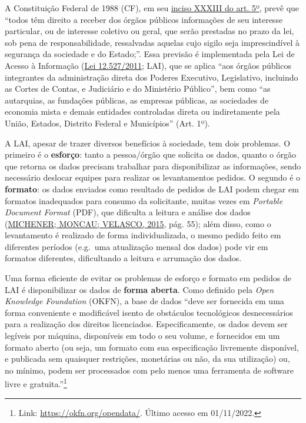\documentclass[12pt,twoside,brazilian]{book}
\begin{document}
A Constituição Federal de 1988 (CF), em seu
\href{https://constituicao.stf.jus.br/dispositivo/cf-88-parte-1-titulo-2-capitulo-1-artigo-5-inciso-33}{inciso
XXXIII do art. 5º}, prevê que ``todos têm direito a receber dos órgãos
públicos informações de seu interesse particular, ou de interesse
coletivo ou geral, que serão prestadas no prazo da lei, sob pena de
responsabilidade, ressalvadas aquelas cujo sigilo seja imprescindível à
segurança da sociedade e do Estado;''. Essa previsão é implementada pela
Lei de Acesso à Informação
(\href{https://www.planalto.gov.br/ccivil_03/_ato2011-2014/2011/lei/l12527.htm}{Lei
12.527/2011}; LAI), que se aplica ``aos órgãos públicos integrantes da
administração direta dos Poderes Executivo, Legislativo, incluindo as
Cortes de Contas, e Judiciário e do Ministério Público'', bem como ``as
autarquias, as fundações públicas, as empresas públicas, as sociedades
de economia mista e demais entidades controladas direta ou indiretamente
pela União, Estados, Distrito Federal e Municípios'' (Art. 1º).

A LAI, apesar de trazer diversos benefícios à sociedade, tem dois
problemas. O primeiro é o \textbf{esforço}: tanto a pessoa/órgão que
solicita os dados, quanto o órgão que retorna os dados precisam
trabalhar para disponibilizar as informações, sendo necessário deslocar
equipes para realizar os levantamentos pedidos. O segundo é o
\textbf{formato}: os dados enviados como resultado de pedidos de LAI
podem chegar em formatos inadequados para consumo da solicitante, muitas
vezes em \emph{Portable Document Format} (PDF), que dificulta a leitura
e análise dos dados (\protect\hyperlink{ref-michener2015}{MICHENER;
MONCAU; VELASCO, 2015}, pág. 55); além disso, como o levantamento é
realizado de forma individualizada, o mesmo pedido feito em diferentes
períodos (e.g.~uma atualização mensal dos dados) pode vir em formatos
diferentes, dificultando a leitura e arrumação dos dados.

Uma forma eficiente de evitar os problemas de esforço e formato em
pedidos de LAI é disponibilizar os dados de \textbf{forma aberta}. Como
definido pela \emph{Open Knowledge Foundation} (OKFN), a base de dados
``deve ser fornecida em uma forma conveniente e modificável isento de
obstáculos tecnológicos desnecessários para a realização dos direitos
licenciados. Especificamente, os dados devem ser legíveis por máquina,
disponíveis em todo o seu volume, e fornecidos em um formato aberto (ou
seja, um formato com sua especificação livremente disponível, e
publicada sem quaisquer restrições, monetárias ou não, da sua
utilização) ou, no mínimo, podem ser processados com pelo menos uma
ferramenta de software livre e gratuita.''\footnote{Link:
  \url{https://okfn.org/opendata/}. Último acesso em 01/11/2022.}
\end{document}
